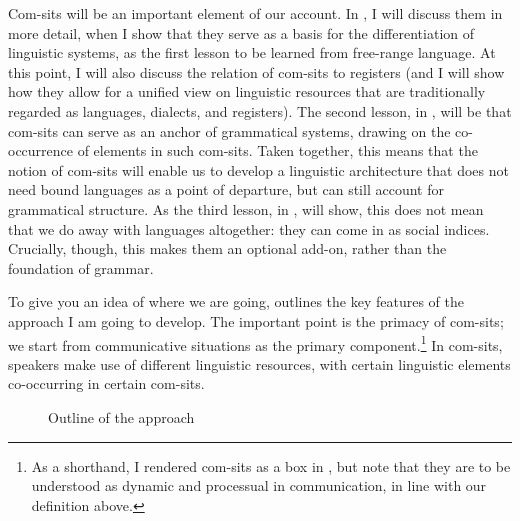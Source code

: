 Com-sits will be an important element of our account. In , I will discuss them in more detail, when I show that they serve as a basis for the differentiation of linguistic systems, as the first lesson to be learned from free-range language. At this point, I will also discuss the relation of com-sits to registers (and I will show how they allow for a unified view on linguistic resources that are traditionally regarded as languages, dialects, and registers). The second lesson, in , will be that com-sits can serve as an anchor of grammatical systems, drawing on the co-occurrence of elements in such com-sits. Taken together, this means that the notion of com-sits will enable us to develop a linguistic architecture that does not need bound languages as a point of departure, but can still account for grammatical structure. As the third lesson, in , will show, this does not mean that we do away with languages altogether: they can come in as social indices. Crucially, though, this makes them an optional add-on, rather than the foundation of grammar.

To give you an idea of where we are going,  outlines the key features of the approach I am going to develop. The important point is the primacy of com-sits; we start from communicative situations as the primary component.\footnote{As a shorthand, I rendered com-sits as a box in , but note that they are to be understood as dynamic and processual in communication, in line with our definition above.} In com-sits, speakers make use of different linguistic resources, with certain linguistic elements co-occurring in certain com-sits.

\begin{figure}[H]

\caption{Outline of the approach}
\label{fig:2}
\end{figure}

